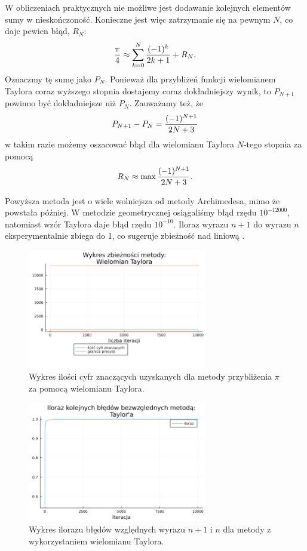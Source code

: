 W obliczeniach praktycznych nie możliwe jest dodawanie kolejnych elementów sumy w nieskończoność. Konieczne jest więc zatrzymanie się na pewnym $N$, co daje pewien błąd, $R_N$:
$$\frac\pi4\approx \sum\limits_{k=0}^N{(-1)^k\over 2k+1}+R_N.$$
Oznaczmy tę sumę jako $P_N$. Ponieważ dla przybliżeń funkcji wielomianem Taylora coraz wyższego stopnia dostajemy coraz dokładniejszy wynik, to $P_{N+1}$ powinno być dokładniejsze niż $P_N$. Zauważamy też, że
$$P_{N+1}-P_N={(-1)^{N+1}\over 2N+3}$$
w takim razie możemy oszacować błąd dla wielomianu Taylora $N$-tego stopnia za pomocą
$$R_N\approx \max{(-1)^{N+1}\over 2N+3}.$$

Powyższa metoda jest o wiele wolniejsza od metody Archimedesa, mimo że powstała później. W metodzie geometrycznej osiągaliśmy błąd rzędu $10^{-12000}$, natomiast wzór Taylora daje błąd rzędu $10^{-10}$. Iloraz wyrazu $n+1$ do wyrazu $n$ eksperymentalnie zbiega do 1, co sugeruje zbieżność nad liniową \cite{bog}.

\begin{figure}[!h]\centering
    \renewcommand{\figurename}{Wykres}
    \includegraphics[width=0.7\textwidth]{../prog/taylor_log_error.png}
    \caption{Wykres ilości cyfr znaczących uzyskanych dla metody przybliżenia  $\pi$ za pomocą wielomianu Taylora.}
    \label{taylor-series-error}
\end{figure}

\begin{figure}[!h]\centering
    \renewcommand{\figurename}{Wykres}
    \includegraphics[width=0.7\textwidth]{../prog/taylor_error_ratio.png}
    \caption{Wykres ilorazu błędów względnych wyrazu $n+1$ i $n$ dla metody z wykorzystaniem wielomianu Taylora.}
    \label{taylor-series-convergence}
\end{figure}


